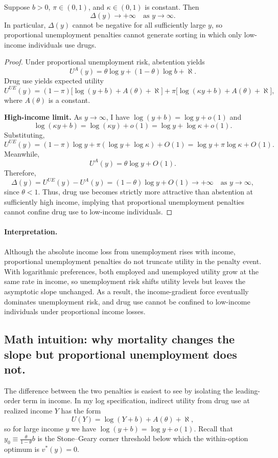 \begin{lemma}
Suppose $b>0$, $\pi\in(0,1)$, and $\kappa\in(0,1)$ is constant.
Then
\[
\Delta(y)\to +\infty \quad \text{as } y\to\infty.
\]
In particular, $\Delta(y)$ cannot be negative for all sufficiently large $y$, so proportional unemployment penalties cannot generate sorting in which only low-income individuals use drugs.
\end{lemma}

\begin{proof}
Under proportional unemployment risk, abstention yields
\[
U^{A}(y)=\theta\log y+(1-\theta)\log b + \aleph.
\]
Drug use yields expected utility
\[
U^{UE}(y)=(1-\pi)\big[\log(y+b)+A(\theta)+\aleph\big] +\pi\big[\log(\kappa y+b)+A(\theta)+\aleph\big],
\]
where $A(\theta)$ is a constant.

\medskip
\noindent\textbf{High-income limit.}
As $y\to\infty$, I have $\log(y+b)=\log y+o(1)$ and
\[
\log(\kappa y+b)=\log(\kappa y)+o(1)=\log y + \log\kappa + o(1).
\]
Substituting,
\[
U^{UE}(y)=(1-\pi)\log y + \pi(\log y+\log\kappa) + O(1)
=\log y + \pi\log\kappa + O(1).
\]
Meanwhile,
\[
U^{A}(y)=\theta\log y + O(1).
\]
Therefore,
\[
\Delta(y)=U^{UE}(y)-U^{A}(y)
=(1-\theta)\log y + O(1)\to +\infty \quad \text{as } y\to\infty,
\]
since $\theta<1$. Thus, drug use becomes strictly more attractive than abstention at sufficiently high income, implying that proportional unemployment penalties cannot confine
drug use to low-income individuals.
\end{proof}

\paragraph{Interpretation.}
Although the absolute income loss from unemployment rises with income, proportional unemployment penalties do not truncate utility in the penalty event. With logarithmic preferences, both employed and unemployed utility grow at the same rate in income, so unemployment risk shifts utility levels but leaves the asymptotic slope unchanged. As a result, the income-gradient force eventually dominates unemployment risk, and drug use cannot be confined to low-income individuals under proportional income losses.

\subsection{Math intuition: why mortality changes the slope but proportional unemployment does not.}
The difference between the two penalties is easiest to see by isolating the leading-order term in income. In my log specification, indirect utility from drug use at realized income $Y$ has the form
\[
U(Y)=\log(Y+b)+A(\theta)+\aleph,
\]
so for large income $y$ we have $\log(y+b)=\log y+o(1)$. Recall that $y_0\equiv \frac{\theta}{1-\theta}b$ is the Stone--Geary corner threshold below which the within-option optimum is $v^*(y)=0$.

